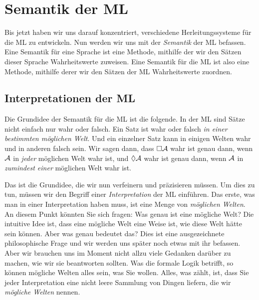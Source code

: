 \chapter{Semantik der ML}
\label{Semantics}

Bis jetzt haben wir uns darauf konzentriert, verschiedene Herleitungssysteme für die ML zu entwickeln. Nun werden wir uns mit der \emph{Semantik} der ML befassen. Eine Semantik für eine Sprache ist eine Methode, mithilfe der wir den Sätzen dieser Sprache Wahrheitswerte zuweisen. Eine Semantik für die ML ist also eine Methode, mithilfe derer wir den Sätzen der ML Wahrheitswerte zuordnen.

\section{Interpretationen der ML}

Die Grundidee der Semantik für die ML ist die folgende. In der ML sind Sätze nicht einfach nur wahr oder falsch. Ein Satz ist wahr oder falsch \emph{in einer bestimmten möglichen Welt}. Und ein einzelner Satz kann in einigen Welten wahr und in anderen falsch sein. Wir sagen dann, dass $\Box \mathcal{A}$ wahr ist genau dann, wenn $\mathcal{A}$ in \emph{jeder} möglichen Welt wahr ist, und $\Diamond\mathcal{A}$ wahr ist genau dann, wenn $\mathcal{A}$ in \emph{zumindest einer} möglichen Welt wahr ist.

Das ist die Grundidee, die wir nun verfeinern und präzisieren müssen. Um dies zu tun, müssen wir den Begriff einer \emph{Interpretation} der ML einführen. Das erste, was man in einer Interpretation haben muss, ist eine Menge von \emph{möglichen Welten}. An diesem Punkt könnten Sie sich fragen: Was genau ist eine mögliche Welt? Die intuitive Idee ist, dass eine mögliche Welt eine Weise ist, wie diese Welt hätte sein können. Aber was genau bedeutet das? Dies ist eine ausgezeichnete philosophische Frage und wir werden uns später noch etwas mit ihr befassen. Aber wir brauchen uns im Moment nicht allzu viele Gedanken darüber zu machen, wie wir sie beantworten sollten. Was die formale Logik betrifft, so können mögliche Welten alles sein, was Sie wollen. Alles, was zählt, ist, dass Sie jeder Interpretation eine nicht leere Sammlung von Dingen liefern, die wir \emph{mögliche Welten} nennen.

